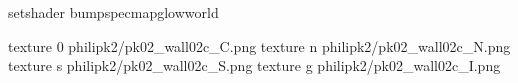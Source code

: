 setshader bumpspecmapglowworld


texture 0 philipk2/pk02_wall02c_C.png
texture n philipk2/pk02_wall02c_N.png
texture s philipk2/pk02_wall02c_S.png
texture g philipk2/pk02_wall02c_I.png

